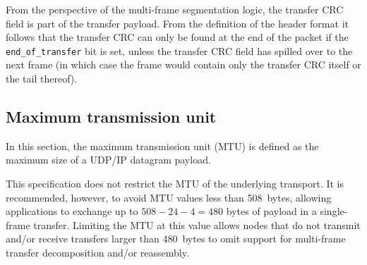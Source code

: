 \begin{remark}
    From the perspective of the multi-frame segmentation logic, the transfer CRC field is part of the transfer payload.
    From the definition of the header format it follows that the transfer CRC can only be found at the end of
    the packet if the \verb|end_of_transfer| bit is set,
    unless the transfer CRC field has spilled over to the next frame
    (in which case the frame would contain only the transfer CRC itself or the tail thereof).
\end{remark}

\subsection{Maximum transmission unit}

In this section, the maximum transmission unit (MTU) is defined as the maximum size of a UDP/IP datagram payload.

This specification does not restrict the MTU of the underlying transport.
It is recommended, however, to avoid MTU values less than 508~bytes,
allowing applications to exchange up to $508 - 24 - 4 = 480$ bytes of payload in a single-frame transfer.
Limiting the MTU at this value allows nodes that do not transmit and/or receive transfers larger than 480~bytes
to omit support for multi-frame transfer decomposition and/or reassembly.

